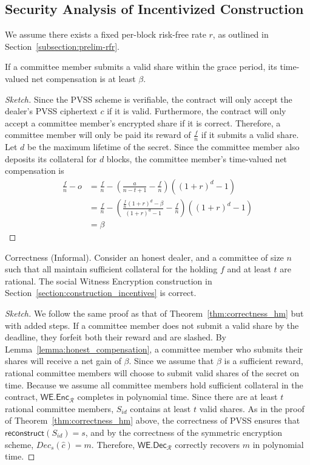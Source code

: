 \subsection{Security Analysis of Incentivized Construction}
We assume there exists a fixed per-block risk-free rate $r$, as outlined in Section~\ref{subsection:prelim-rfr}.
\begin{lemma}\label{lemma:honest_compensation}
    If a committee member submits a valid share within the grace period, its time-valued net compensation is at least $\beta$.
\end{lemma}
\begin{proof}[Sketch]
    Since the PVSS scheme is verifiable, the contract will only accept the dealer's PVSS ciphertext $c$ if it is valid.
    Furthermore, the contract will only accept a committee member's encrypted share if it is correct.
    Therefore, a committee member will only be paid its reward of $\frac{f}{n}$ if it submits a valid share.
    Let $d$ be the maximum lifetime of the secret.
    Since the committee member also deposits its collateral for $d$ blocks, the committee member's time-valued net compensation is
    \begin{align*}
        \frac{f}{n} - o &= \frac{f}{n} - (\frac{a}{n - t + 1} - \frac{f}{n})((1 + r)^d - 1) \\
        &= \frac{f}{n} - (\frac{\frac{f}{n}(1 + r)^d - \beta}{(1 + r)^d - 1} - \frac{f}{n})((1 + r)^d - 1) \\
        &= \beta
    \end{align*}
\end{proof}
\begin{theorem}{Correctness (Informal).}
    Consider an honest dealer, and a committee of size $n$ such that all maintain sufficient collateral for the holding $f$ and at least $t$ are rational.
    The social Witness Encryption construction in Section~\ref{section:construction_incentives} is correct.
\end{theorem}
\begin{proof}[Sketch]
    We follow the same proof as that of Theorem~\ref{thm:correctness_hm} but with added steps.
    If a committee member does not submit a valid share by the deadline, they forfeit both their reward and are slashed.
    By Lemma~\ref{lemma:honest_compensation}, a committee member who submits their shares will receive a net gain of $\beta$.
    Since we assume that $\beta$ is a sufficient reward, rational committee members will choose to submit valid shares of the secret on time.
    Because we assume all committee members hold sufficient collateral in the contract, $\textsf{WE.Enc}_\mathcal{R}$ completes in polynomial time.
    Since there are at least $t$ rational committee members, $S_{id}$ contains at least $t$ valid shares.
    As in the proof of Theorem~\ref{thm:correctness_hm} above, the correctness of PVSS ensures that $\textsf{reconstruct}(S_{id}) = s$, and by the correctness of the symmetric encryption scheme, $Dec_s(\hat{c}) = m$.
    Therefore, $\textsf{WE.Dec}_\mathcal{R}$ correctly recovers $m$ in polynomial time.
\end{proof}

